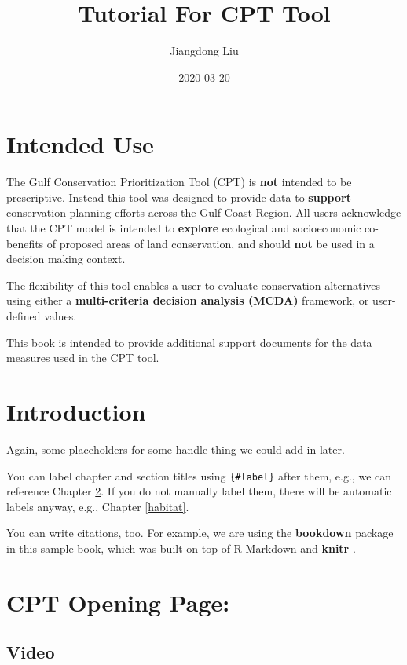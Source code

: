 \documentclass[
]{book}
\title{Tutorial For CPT Tool}
\author{Jiangdong Liu}
\date{2020-03-20}
\begin{document}
\maketitle

{
\setcounter{tocdepth}{1}
\tableofcontents
}
\hypertarget{intended-use}{%
\chapter{Intended Use}\label{intended-use}}

The Gulf Conservation Prioritization Tool (CPT) is \textbf{not} intended to be prescriptive. Instead this tool was designed to provide data to \textbf{support} conservation planning efforts across the Gulf Coast Region. All users acknowledge that the CPT model is intended to \textbf{explore} ecological and socioeconomic co-benefits of proposed areas of land conservation, and should \textbf{not} be used in a decision making context.

The flexibility of this tool enables a user to evaluate conservation alternatives using either a \textbf{multi-criteria decision analysis (MCDA)} framework, or user-defined values.

This book is intended to provide additional support documents for the data measures used in the CPT tool.

\hypertarget{intro}{%
\chapter{Introduction}\label{intro}}

Again, some placeholders for some handle thing we could add-in later.

You can label chapter and section titles using \texttt{\{\#label\}} after them, e.g., we can reference Chapter \ref{intro}. If you do not manually label them, there will be automatic labels anyway, e.g., Chapter \ref{habitat}.

You can write citations, too. For example, we are using the \textbf{bookdown} package \citep{chuck2019} in this sample book, which was built on top of R Markdown and \textbf{knitr} \citep{xie2015}.

\hypertarget{cpt-opening-page}{%
\chapter{CPT Opening Page:}\label{cpt-opening-page}}

\hypertarget{video}{%
\section{Video}\label{video}}
\end{document}
